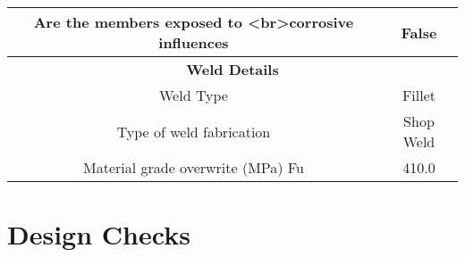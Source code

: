 \documentclass{article}%
\begin{document}
\begin{longtable}{|p{5cm}|p{2cm}|p{2cm}|p{2cm}|p{5cm}|}
\hline%
\multicolumn{3}{|c|}{Are the members exposed to <br>corrosive influences}&\multicolumn{2}{|c|}{False}\\%
\hline%
\hline%
\multicolumn{5}{|c|}{\textbf{Weld Details}}\\%
\hline%
\hline%
\multicolumn{3}{|c|}{Weld Type}&\multicolumn{2}{|c|}{Fillet}\\%
\hline%
\hline%
\multicolumn{3}{|c|}{Type of weld fabrication}&\multicolumn{2}{|c|}{Shop Weld}\\%
\hline%
\hline%
\multicolumn{3}{|c|}{Material grade overwrite (MPa) Fu}&\multicolumn{2}{|c|}{410.0}\\%
\hline%
\end{longtable}

%
%
\section{Design Checks}%
\label{sec:DesignChecks}%
\end{document}

